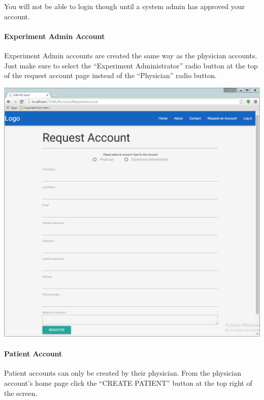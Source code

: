 \documentclass[letterpaper,10pt,english]{sphinxmanual}
\begin{document}
You will not be able to login though until a system admin has approved your account.


\paragraph{Experiment Admin Account}
\label{user_guide/account_creation:experiment-admin-account}
Experiment Admin accounts are created the same way as the physician accounts. Just make sure to select the ``Experiment Administrator''
radio button at the top of the request account page instead of the ``Physician'' radio button.

\includegraphics{request_account.png}


\paragraph{Patient Account}
\label{user_guide/account_creation:create-patient-account}\label{user_guide/account_creation:patient-account}
Patient accounts can only be created by their physician. From the physician account's home page click the ``CREATE PATIENT''
button at the top right of the screen.
\end{document}
